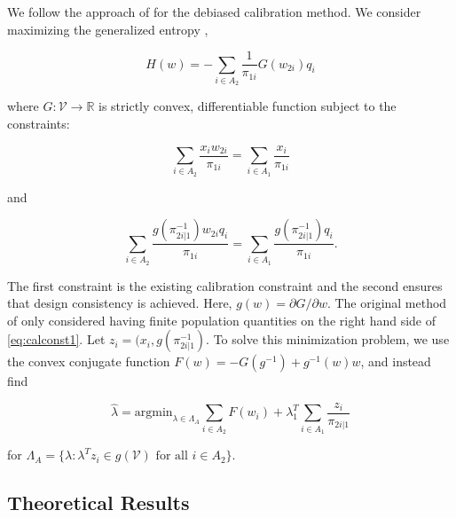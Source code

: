 \documentclass[12pt]{article}
\newcommand{\argmin}{{\text{argmin}}}
\newcommand{\R}{\mathbb{R}}
\begin{document}


We follow the approach of \cite{kwon2024debiased} for the debiased calibration
method. We consider maximizing the generalized entropy \cite{gneiting2007strictly},

\begin{equation}\label{eq:primalloss}
  H(w) = - \sum_{i \in A_2} \frac{1}{\pi_{1i}} G(w_{2i}) q_i
\end{equation}

where $G: \mathcal{V} \to \R$ is strictly convex, differentiable function
subject to the constraints:

\begin{equation}\label{eq:calconst1}
  \sum_{i \in A_2} \frac{x_i w_{2i}}{\pi_{1i}} = 
\sum_{i \in A_1} \frac{x_i}{\pi_{1i}}
\end{equation}

and 

\begin{equation}\label{eq:calconst2}
  \sum_{i \in A_2} \frac{g(\pi_{2i|1}^{-1})w_{2i}q_i}{\pi_{1i}} = 
  \sum_{i \in A_1} \frac{g(\pi_{2i|1}^{-1})q_i}{\pi_{1i}}.
\end{equation}

The first constraint is the existing calibration constraint and the second
ensures that design consistency is achieved. Here, 
$g(w) = \partial G / \partial w$. 
The original method of \cite{kwon2024debiased} only considered having finite
population quantities on the right hand side of \ref{eq:calconst1}.
Let $z_i =
(x_i, g(\pi_{2i|1}^{-1})$. To solve this minimization problem, we use the convex
conjugate function $F(w) = -G(g^{-1}) + g^{-1}(w)w$, and instead find

$$ \hat \lambda = \argmin_{\lambda \in \Lambda_A} \sum_{i \in A_2} F(w_i) +
\lambda_1^T \sum_{i \in A_1} \frac{z_i}{\pi_{2i|1}}$$

for $\Lambda_A = \{\lambda: \lambda^T z_i \in g(\mathcal{V}) \text{ for all } i
\in A_2\}$.

\subsection*{Theoretical Results}
\end{document}
